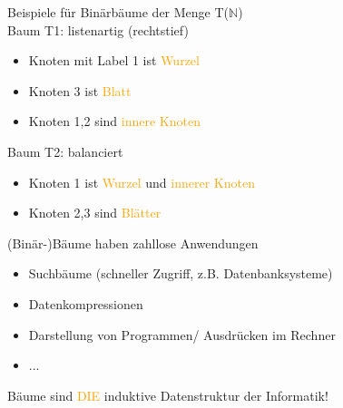 \documentclass[paper=a4, fontsize=11pt]{scrartcl}
\numberwithin{equation}{section}
\numberwithin{figure}{section}
\numberwithin{table}{section}
\begin{document}
\begin{lstlistig}
Beispiele für Binärbäume der Menge T($\mathbb{N}$) \\
Baum T1: listenartig (rechtstief) \\
\begin{itemize}
\item Knoten mit Label 1 ist \textcolor{orange}{Wurzel}
\item Knoten 3 ist \textcolor{orange}{Blatt}
\item Knoten 1,2 sind \textcolor{orange}{innere Knoten}
\end{itemize}


Baum T2: balanciert \\
\begin{itemize}
\item Knoten 1 ist \textcolor{orange}{Wurzel} und \textcolor{orange}{innerer Knoten}
\item Knoten 2,3 sind \textcolor{orange}{Blätter}
\end{itemize}


(Binär-)Bäume haben zahllose Anwendungen \\
\begin{itemize}
\item Suchbäume (schneller Zugriff, z.B. Datenbanksysteme)
\item Datenkompressionen
\item Darstellung von Programmen/ Ausdrücken im  Rechner
\item ...
\end{itemize}

Bäume sind \textcolor{orange}{DIE} induktive Datenstruktur der Informatik! \\


\end{lstlistig}
\end{document}
